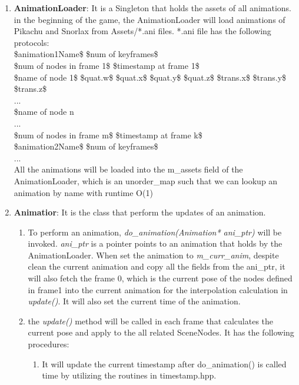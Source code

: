 \documentclass {article}
\begin{document}
\begin{enumerate}
    \item \textbf{AnimationLoader}: It is a Singleton that holds the assets of all animations. \\
    in the beginning of the game, the AnimationLoader will load animations of Pikachu and Snorlax from Assets/*.ani files. *.ani file has the following protocols: \\
        \${animation1Name}\$ \${num of keyframes}\$  \\
        \indent \${num of nodes in frame 1}\$ \${timestamp at frame 1}\$    \\
        \indent \indent \${name of node 1}\$ \$quat.w\$ \$quat.x\$ \$quat.y\$ \$quat.z\$ \$trans.x\$ \$trans.y\$ \$trans.z\$ \\
        \indent \indent ... \\
        \indent \indent \${name of node n} \\
        \indent ... \\
        \indent \${num of nodes in frame m}\$ \${timestamp at frame k}\$    \\
        \${animation2Name}\$ \${num of keyframes}\$  \\
        ... \\
       All the animations will be loaded into the m\_assets field of the AnimationLoader, which is an unorder\_map such that we can 
       lookup an animation by name with runtime O(1)
    \item \textbf{Animatior}: It is the class that perform the updates of an animation.
    \begin{enumerate}
        \item To perform an animation, \textit{do\_animation(Animation* ani\_ptr)} will be invoked. \textit{ani\_ptr} is a pointer points to an animation that holds by the AnimationLoader. When
        set the animation to \textit{m\_curr\_anim}, despite clean the current animation and copy all the fields from the ani\_ptr, it will also fetch the frame 0, which is the current pose
        of the nodes defined in frame1 into the current animation for the interpolation calculation in \textit{update()}. It will also set the current time of the animation.
        \item the \textit{update()} method will be called in each frame that calculates the current pose and apply to the all related SceneNodes. It has the following procedures:
        \begin{enumerate}
            \item It will update the current timestamp after do\_animation() is called time by utilizing the routines in timestamp.hpp.

\end{enumerate}
\end{enumerate}
\end{enumerate}
\end{document}
